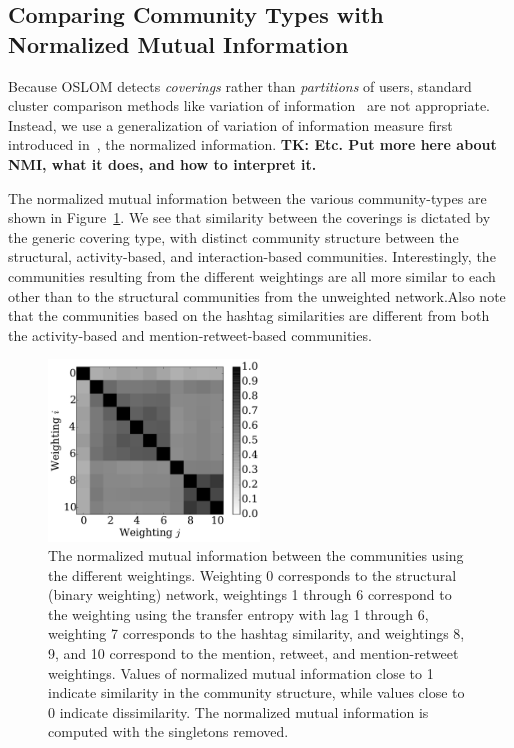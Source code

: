 \subsection{Comparing Community Types with Normalized Mutual Information}

Because OSLOM detects \emph{coverings} rather than \emph{partitions} of users, standard cluster comparison methods like variation of information~\cite{meilua2003comparing} are not appropriate. Instead, we use a generalization of variation of information measure first introduced in~\cite{lancichinetti2009detecting}, the normalized information. \textbf{TK: Etc. Put more here about NMI, what it does, and how to interpret it.}

The normalized mutual information between the various community-types are shown in Figure~\ref{Fig-compare_coverings}. We see that similarity between the coverings is dictated by the generic covering type, with distinct community structure between the structural, activity-based, and interaction-based communities. Interestingly, the communities resulting from the different weightings are all more similar to each other than to the structural communities from the unweighted network.Also note that the communities based on the hashtag similarities are different from both the activity-based and mention-retweet-based communities.

\begin{figure}[ht]
  \centering
\includegraphics[width=0.50\textwidth]{figures/nmi_singletons.pdf}
\caption{The normalized mutual information between the communities using the different weightings. Weighting 0 corresponds to the structural (binary weighting) network, weightings 1 through 6 correspond to the weighting using the transfer entropy with lag 1 through 6, weighting 7 corresponds to the hashtag similarity, and weightings 8, 9, and 10 correspond to the mention, retweet, and mention-retweet weightings. Values of normalized mutual information close to 1 indicate similarity in the community structure, while values close to 0 indicate dissimilarity. The normalized mutual information is computed with the singletons removed.}
\label{Fig-compare_coverings}
\end{figure}

